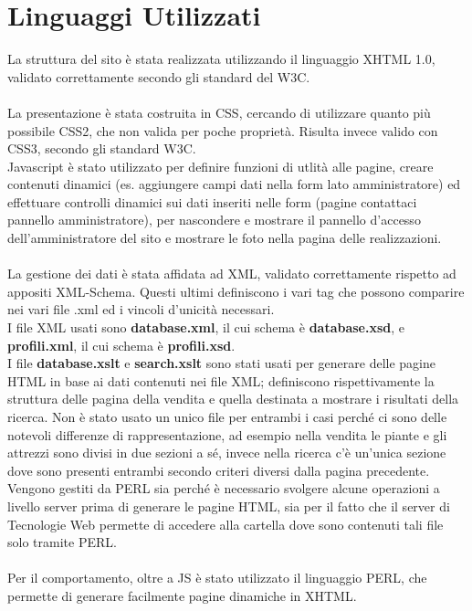 \section{Linguaggi Utilizzati}{
	La struttura del sito è stata realizzata utilizzando il linguaggio XHTML 1.0, validato correttamente secondo gli standard del W3C. \\
	\\
	La presentazione è stata costruita in CSS, cercando di utilizzare quanto più possibile CSS2, che non valida per poche proprietà. Risulta invece valido con CSS3, secondo gli standard W3C.
	\\
	Javascript è stato utilizzato per definire funzioni di utlità alle pagine, creare contenuti dinamici (es. aggiungere campi dati nella form lato amministratore) ed effettuare controlli dinamici sui dati inseriti nelle form (pagine contattaci pannello amministratore), per nascondere e mostrare il pannello d'accesso dell'amministratore del sito e mostrare le foto nella pagina delle realizzazioni.\\
	\\
	La gestione dei dati è stata affidata ad XML, validato correttamente rispetto ad appositi XML-Schema. Questi ultimi definiscono i vari tag che possono comparire nei vari file .xml ed i vincoli d'unicità necessari. \\
	I file XML usati sono \textbf{database.xml}, il cui schema è \textbf{database.xsd}, e \textbf{profili.xml}, il cui schema è \textbf{profili.xsd}.\\
	I file \textbf{database.xslt} e \textbf{search.xslt} sono stati usati per generare delle pagine HTML in base ai dati contenuti nei file XML; definiscono rispettivamente la struttura delle pagina della vendita e quella destinata a mostrare i risultati della ricerca. Non è stato usato un unico file per entrambi i casi perché ci sono delle notevoli differenze di rappresentazione, ad esempio nella vendita le piante e gli attrezzi sono divisi in due sezioni a sé, invece nella ricerca c'è un'unica sezione dove sono presenti entrambi secondo criteri diversi dalla pagina precedente.
	Vengono gestiti da PERL sia perché è necessario svolgere alcune operazioni a livello server prima di generare le pagine HTML, sia per il fatto che il server di Tecnologie Web permette di accedere alla cartella dove sono contenuti tali file solo tramite PERL.\\
	\\
	Per il comportamento, oltre a JS è stato utilizzato il linguaggio PERL, che permette di generare facilmente pagine dinamiche in XHTML.\\ 
}
